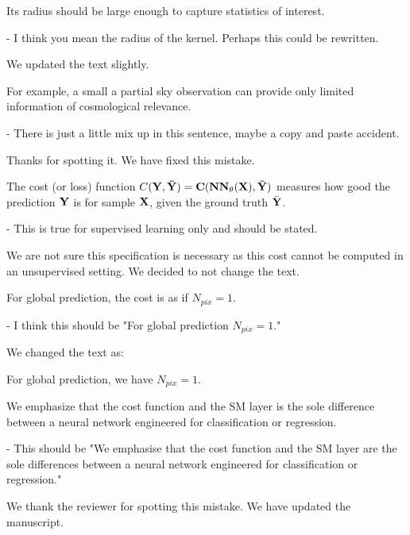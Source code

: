 \documentclass[12pt,a4paper]{article}
\newcommand{\nati}[1]{{\color[rgb]{.1,.6,.1}{NP: #1}}}
\newcommand{\todo}[1]{{\color[rgb]{.6,.1,.6}{TODO: #1}}}
\newcommand{\1}{\b{1}}              %
\newcommand{\0}{\b{0}}              %
\begin{document}
\begin{mdframed}[style=comment]
Its radius should be large enough to capture statistics of interest.

- I think you mean the radius of the kernel. Perhaps this could be rewritten.
\end{mdframed}
We updated the text slightly.

\begin{mdframed}[style=comment]
For example, a small a partial sky observation can provide only limited information of cosmological relevance.

- There is just a little mix up in this sentence, maybe a copy and paste accident.
\end{mdframed}
Thanks for spotting it. We have fixed this mistake.

\begin{mdframed}[style=comment]
The cost (or loss) function $C(\bf{Y},\bar{\bf{Y}}) = C(NN_\theta(\bf{X}),\bar{\bf{Y}})$ measures how good the prediction $\bf{Y}$ is for sample $\bf{X}$, given the ground truth $\bar{\bf{Y}}$.

- This is true for supervised learning only and should be stated.
\end{mdframed}
\todo{To check: @michael}
We are not sure this specification is necessary as this cost cannot be computed in an unsupervised setting. We decided to not change the text.

\begin{mdframed}[style=comment]
For global prediction, the cost is as if $N_{pix} = 1$.

- I think this should be "For global prediction $N_{pix} = 1$."
\end{mdframed}
\todo{To check: @michael}

We changed the text as:
\begin{mdframed}[style=manuscript]
For global prediction, we have $N_{pix} = 1$.
\end{mdframed}

\begin{mdframed}[style=comment]
We emphasize that the cost function and the SM layer is the sole difference between a neural network engineered for classification or regression.

- This should be "We emphasise that the cost function and the SM layer are the sole differences between a neural network engineered for classification or regression."
\end{mdframed}
We thank the reviewer for spotting this mistake. We have updated the manuscript.
\end{document}
